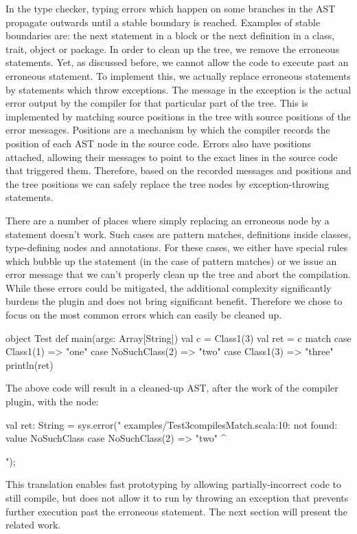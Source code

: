 In the type checker, typing errors which happen on some branches in the AST propagate outwards until a stable boundary is reached. Examples of stable boundaries are: the next statement in a block or the next definition in a class, trait, object or package. In order to clean up the tree, we remove the erroneous statements. Yet, as discussed before, we cannot allow the code to execute past an erroneous statement. To implement this, we actually replace erroneous statements by statements which throw exceptions. The message in the exception is the actual error output by the compiler for that particular part of the tree. This is implemented by matching source positions in the tree with source positions of the error messages. Positions are a mechanism by which the compiler records the position of each AST node in the source code. Errors also have positions attached, allowing their messages to point to the exact lines in the source code that triggered them. Therefore, based on the recorded messages and positions and the tree positions we can safely replace the tree nodes by exception-throwing statements.

There are a number of places where simply replacing an erroneous node by a statement doesn't work. Such cases are pattern matches, definitions inside classes, type-defining nodes and annotations. For these cases, we either have special rules which bubble up the statement (in the case of pattern matches) or we issue an error message that we can't properly clean up the tree and abort the compilation. While these errors could be mitigated, the additional complexity significantly burdens the plugin and does not bring significant benefit. Therefore we chose to focus on the most common errors which can easily be cleaned up.

\begin{lstlisting-nobreak}
 object Test {
   def main(args: Array[String]) {
     val c = Class1(3)
     val ret =
       c match {
         case Class1(1) => "one"
         case NoSuchClass(2) => "two"
         case Class1(3) => "three"
       }
     println(ret)
   }
 }
\end{lstlisting-nobreak}

The above code will result in a cleaned-up AST, after the work of the compiler plugin, with the node:

\begin{lstlisting-nobreak}
val ret: String = sys.error("
examples/Test3compilesMatch.scala:10: not found: value NoSuchClass
	   		case NoSuchClass(2) => "two"
                             ^

");
\end{lstlisting-nobreak}

This translation enables fast prototyping by allowing partially-incorrect code to still compile, but does not allow it to run by throwing an exception that prevents further execution past the erroneous statement. The next section will present the related work.
